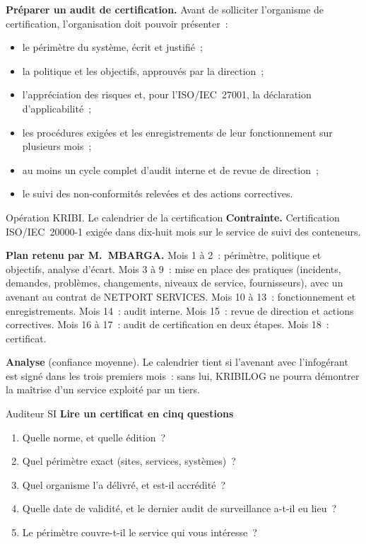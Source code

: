 \begin{boxprocedure}
\textbf{Préparer un audit de certification.} Avant de solliciter
l'organisme de certification, l'organisation doit pouvoir présenter~:
\begin{itemize}
    \item le périmètre du système, écrit et justifié~;
    \item la politique et les objectifs, approuvés par la direction~;
    \item l'appréciation des risques et, pour l'ISO/IEC~27001, la
          déclaration d'applicabilité~;
    \item les procédures exigées et les enregistrements de leur
          fonctionnement sur plusieurs mois~;
    \item au moins un cycle complet d'audit interne et de revue de
          direction~;
    \item le suivi des non-conformités relevées et des actions correctives.
\end{itemize}
\end{boxprocedure}

\begin{boxscenario}{Opération KRIBI. Le calendrier de la certification}
\textbf{Contrainte.} Certification ISO/IEC~20000-1 exigée dans dix-huit
mois sur le service de suivi des conteneurs.

\medskip
\textbf{Plan retenu par M.~MBARGA.} Mois 1 à 2~: périmètre, politique et
objectifs, analyse d'écart. Mois 3 à 9~: mise en place des pratiques
(incidents, demandes, problèmes, changements, niveaux de service,
fournisseurs), avec un avenant au contrat de NETPORT SERVICES. Mois 10 à
13~: fonctionnement et enregistrements. Mois 14~: audit interne. Mois 15~:
revue de direction et actions correctives. Mois 16 à 17~: audit de
certification en deux étapes. Mois 18~: certificat.

\medskip
\textbf{Analyse} (confiance moyenne). Le calendrier tient si l'avenant avec
l'infogérant est signé dans les trois premiers mois~: sans lui, KRIBILOG
ne pourra démontrer la maîtrise d'un service exploité par un tiers.
\end{boxscenario}

\begin{boxmetier}{Auditeur SI}
\textbf{Lire un certificat en cinq questions}
\begin{enumerate}
    \item Quelle norme, et quelle édition~?
    \item Quel périmètre exact (sites, services, systèmes)~?
    \item Quel organisme l'a délivré, et est-il accrédité~?
    \item Quelle date de validité, et le dernier audit de surveillance
          a-t-il eu lieu~?
    \item Le périmètre couvre-t-il le service qui vous intéresse~?
\end{enumerate}
\end{boxmetier}

